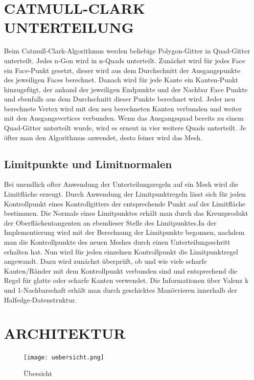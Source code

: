 \section{\Large CATMULL-CLARK UNTERTEILUNG}
Beim Catmull-Clark-Algorithmus werden beliebige Polygon-Gitter in Quad-Gitter unterteilt. Jedes n-Gon wird in n-Quads unterteilt. Zunächst wird für jedes Face ein Face-Punkt gesetzt, dieser wird aus dem Durchschnitt der Ausgangspunkte des jeweiligen Faces berechnet. Danach wird für jede Kante ein Kanten-Punkt hinzugefügt, der anhand der jeweiligen Endpunkte und der Nachbar Face Punkte und ebenfalls aus dem Durchschnitt dieser Punkte berechnet wird. Jeder neu berechnete Vertex wird mit den neu berechneten Kanten verbunden und weiter mit den Ausgangsvertices verbunden. Wenn das Ausgangsquad bereits zu einem Quad-Gitter unterteilt wurde, wird es erneut in vier weitere Quads unterteilt. Je öfter man den Algorithmus anwendet, desto feiner wird das Mesh.

\subsection{Limitpunkte und Limitnormalen}
Bei unendlich ofter Anwendung der Unterteilungsregeln auf ein Mesh wird die Limitfläche erzeugt. Durch Anwendung der Limitpunktregeln lässt sich für jeden Kontrollpunkt eines Kontrollgitters der entsprechende Punkt auf der Limitfläche bestimmen. Die Normale eines Limitpunktes erhält man durch das Kreuzprodukt der Oberflächentangenten an ebendieser Stelle des Limitpunktes.\newline In der Implementierung wird mit der Berechnung der Limitpunkte begonnen, nachdem man die Kontrollpunkte des neuen Meshes durch einen Unterteilungsschritt erhalten hat. Nun wird für jeden einzelnen Kontrollpunkt die Limitpunktregel angewandt. Dazu wird zunächst überprüft, ob und wie viele scharfe Kanten/Ränder mit dem Kontrollpunkt verbunden sind und entsprechend die Regel für glatte oder scharfe Kanten verwendet. Die Informationen über Valenz k und 1-Nachbarschaft erhält man durch geschicktes Manövrieren innerhalb der Halfedge-Datenstruktur.

\section{\Large ARCHITEKTUR}

\begin{figure}[H]
\centering
\texttt{[image: uebersicht.png]}
\caption{Übersicht}
\label{fig1}
\end{figure}

